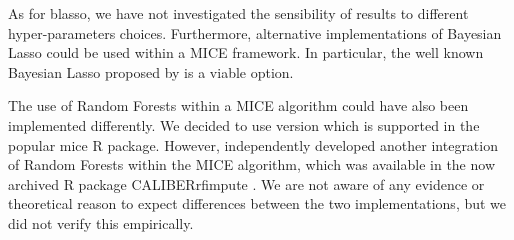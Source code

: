 	As for blasso, we have not investigated the sensibility of results to different hyper-parameters choices.
	Furthermore, alternative implementations of Bayesian Lasso could be used within a MICE framework.
	In particular, the well known Bayesian Lasso proposed by \cite{parkCasella:2008} is a viable option.

	The use of Random Forests within a MICE algorithm could have also been implemented differently.
	We decided to use \cite{dooveEtAl:2014} version which is supported in the popular 
	mice R package.
	However, \cite{shahEtAl:2014} independently developed another integration of Random Forests
	within the MICE algorithm, which was available in the now archived R package CALIBERrfimpute
	\citep{CALIBERrfimpute}.
	We are not aware of any evidence or theoretical reason to expect differences between the two implementations, 
	but we did not verify this empirically.

